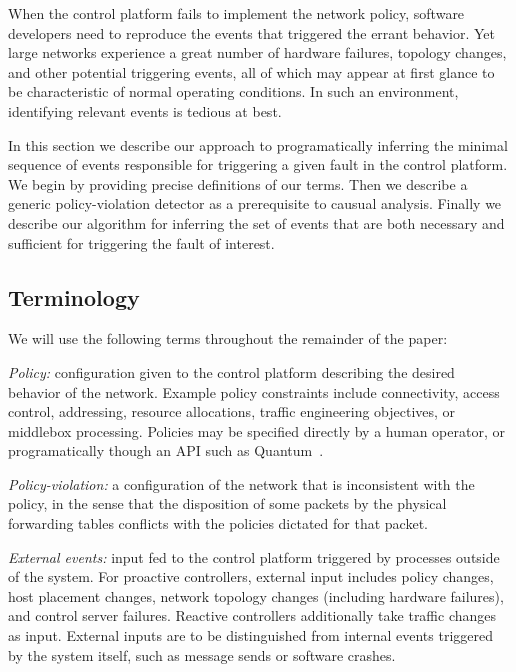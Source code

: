 When the control platform fails to implement the network policy, software
developers need to reproduce the events that triggered the errant behavior.
Yet large networks experience a great number of hardware failures, topology changes,
and other potential triggering events,
all of which may appear at first glance to be characteristic of normal operating
conditions. In such an environment, identifying relevant events
is tedious at best.

In this section we describe our approach to programatically inferring the minimal
sequence of events responsible for triggering a given fault in the
control platform. We begin by providing precise definitions of our terms. Then we
describe a generic policy-violation detector as a prerequisite to causual analysis.
Finally we describe our algorithm for inferring the set of events that are both necessary
and sufficient for triggering the fault of interest.

\subsection{Terminology}


We will use the following terms throughout the remainder of the paper:

{\em Policy:} configuration given to the control platform describing the
desired behavior of the network. Example policy constraints include connectivity, access
control, addressing, resource allocations, traffic engineering objectives,
or middlebox processing. Policies may be specified directly by a human operator, or
programatically though an API such as Quantum~\cite{quantum}. 

{\em Policy-violation:} a configuration of the network that is inconsistent
with the policy, in the sense that the disposition of some packets by the
physical forwarding tables conflicts with the policies dictated for that packet.

{\em External events:} input fed to the control platform triggered by processes outside
of the system. For proactive controllers, external input includes policy
changes, host placement changes, network topology changes (including hardware
failures), and control server failures. Reactive controllers
additionally take traffic changes as input. External inputs are to be distinguished
from internal events triggered by the system itself, such as message sends or software
crashes.

